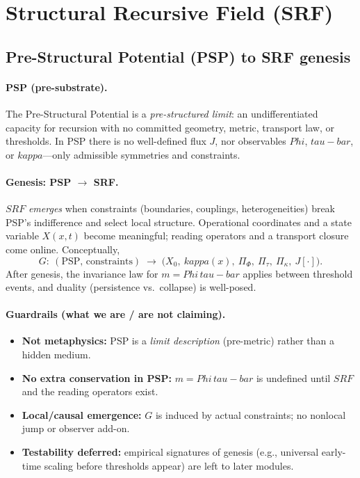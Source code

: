 \documentclass[12pt]{article}
\newcommand{\FoldDensity}{\Phi}
\newcommand{\FoldTime}{\bar{\tau}}
\newcommand{\Threshold}{\kappa}
\newcommand{\SRF}{\mathcal{F}_{\mathrm{SR}}}
\def\FoldDensity{Phi}%
\def\FoldTime{tau-bar}%
\def\Threshold{kappa}%
\def\SRF{SRF}%
\def\bar#1{#1}%
\def\mathcal#1{#1}%
\def\mathrm#1{#1}%
\begin{document}

\section{Structural Recursive Field (SRF)}

\subsection[Pre-Structural Potential (PSP) to SRF genesis]{Pre-Structural Potential (PSP) to SRF genesis}
\paragraph{PSP (pre-substrate).}
The Pre-Structural Potential is a \emph{pre-structured limit}: an undifferentiated capacity for recursion with
no committed geometry, metric, transport law, or thresholds. In PSP there is no well-defined flux $J$, nor observables
$\FoldDensity$, $\FoldTime$, or $\Threshold$—only admissible symmetries and constraints.

\paragraph{Genesis: PSP $\to$ SRF.}
$\SRF$ \emph{emerges} when constraints (boundaries, couplings, heterogeneities) break PSP’s indifference and select local structure.
Operational coordinates and a state variable $X(x,t)$ become meaningful; reading operators and a transport closure come online.
Conceptually,
\[
\mathcal{G}:\ (\text{PSP},\, \text{constraints}) \;\longrightarrow\;
\bigl(X_0,\ \Threshold(x),\ \Pi_\Phi,\ \Pi_{\bar{\tau}},\ \Pi_\kappa,\ J[\cdot]\bigr).
\]
After genesis, the invariance law for $m=\FoldDensity\,\FoldTime$ applies between threshold events, and duality (persistence vs.\ collapse) is well-posed.

\paragraph{Guardrails (what we are / are not claiming).}
\begin{itemize}
  \item \textbf{Not metaphysics:} PSP is a \emph{limit description} (pre-metric) rather than a hidden medium.
  \item \textbf{No extra conservation in PSP:} $m=\FoldDensity\,\FoldTime$ is undefined until $\SRF$ and the reading operators exist.
  \item \textbf{Local/causal emergence:} $\mathcal{G}$ is induced by actual constraints; no nonlocal jump or observer add-on.
  \item \textbf{Testability deferred:} empirical signatures of genesis (e.g., universal early-time scaling before thresholds appear) are left to later modules.
\end{itemize}
\end{document}
